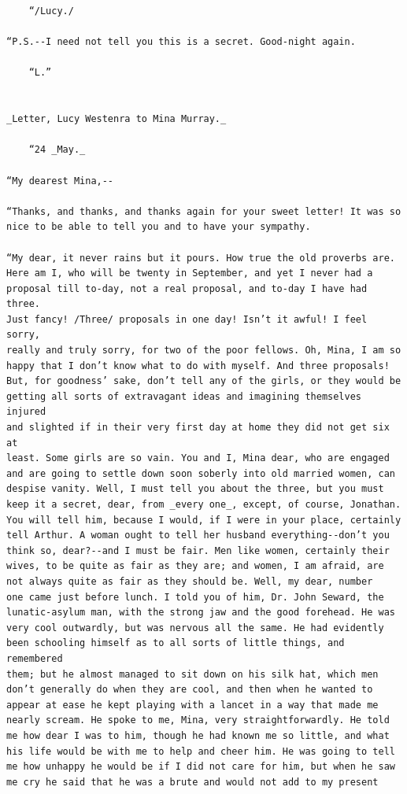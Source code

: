 \documentclass{article}
\begin{document}
\begin{verbatim}
    “/Lucy./

“P.S.--I need not tell you this is a secret. Good-night again.

    “L.”


_Letter, Lucy Westenra to Mina Murray._

    “24 _May._

“My dearest Mina,--

“Thanks, and thanks, and thanks again for your sweet letter! It was so
nice to be able to tell you and to have your sympathy.

“My dear, it never rains but it pours. How true the old proverbs are.
Here am I, who will be twenty in September, and yet I never had a
proposal till to-day, not a real proposal, and to-day I have had three.
Just fancy! /Three/ proposals in one day! Isn’t it awful! I feel sorry,
really and truly sorry, for two of the poor fellows. Oh, Mina, I am so
happy that I don’t know what to do with myself. And three proposals!
But, for goodness’ sake, don’t tell any of the girls, or they would be
getting all sorts of extravagant ideas and imagining themselves injured
and slighted if in their very first day at home they did not get six at
least. Some girls are so vain. You and I, Mina dear, who are engaged
and are going to settle down soon soberly into old married women, can
despise vanity. Well, I must tell you about the three, but you must
keep it a secret, dear, from _every one_, except, of course, Jonathan.
You will tell him, because I would, if I were in your place, certainly
tell Arthur. A woman ought to tell her husband everything--don’t you
think so, dear?--and I must be fair. Men like women, certainly their
wives, to be quite as fair as they are; and women, I am afraid, are
not always quite as fair as they should be. Well, my dear, number
one came just before lunch. I told you of him, Dr. John Seward, the
lunatic-asylum man, with the strong jaw and the good forehead. He was
very cool outwardly, but was nervous all the same. He had evidently
been schooling himself as to all sorts of little things, and remembered
them; but he almost managed to sit down on his silk hat, which men
don’t generally do when they are cool, and then when he wanted to
appear at ease he kept playing with a lancet in a way that made me
nearly scream. He spoke to me, Mina, very straightforwardly. He told
me how dear I was to him, though he had known me so little, and what
his life would be with me to help and cheer him. He was going to tell
me how unhappy he would be if I did not care for him, but when he saw
me cry he said that he was a brute and would not add to my present

\end{verbatim}
\end{document}
